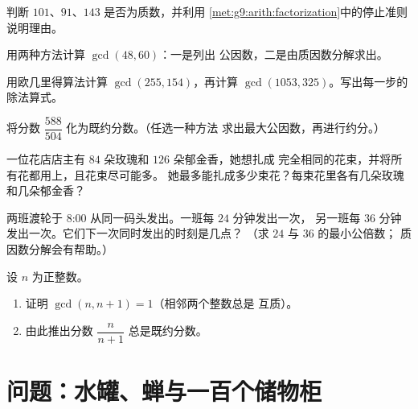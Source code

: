 \begin{exercise}[$\star$]\label{exo:g9:arith:4}
判断 $101$、$91$、$143$ 是否为质数，并利用
\cref{met:g9:arith:factorization}中的停止准则说明理由。
\end{exercise}

\begin{exercise}[$\star$]\label{exo:g9:arith:5}
用两种方法计算 $\gcd(48, 60)$：一是列出
公因数，二是由质因数分解求出。
\end{exercise}

\begin{exercise}[$\star\star$]\label{exo:g9:arith:6}
用欧几里得算法计算 $\gcd(255, 154)$，再计算
$\gcd(1053, 325)$。写出每一步的除法算式。
\end{exercise}

\begin{exercise}[$\star\star$]\label{exo:g9:arith:7}
将分数 $\dfrac{588}{504}$ 化为既约分数。（任选一种方法
求出最大公因数，再进行约分。）
\end{exercise}

\begin{exercise}[$\star\star$]\label{exo:g9:arith:8}
一位花店店主有 $84$ 朵玫瑰和 $126$ 朵郁金香，她想扎成
完全相同的花束，并将所有花都用上，且花束尽可能多。
她最多能扎成多少束花？每束花里各有几朵玫瑰和几朵郁金香？
\end{exercise}

\begin{exercise}[$\star\star$]\label{exo:g9:arith:9}
两班渡轮于 8:00 从同一码头发出。一班每 $24$ 分钟发出一次，
另一班每 $36$ 分钟发出一次。它们下一次同时发出的时刻是几点？
（求 $24$ 与 $36$ 的最小公倍数；
质因数分解会有帮助。）
\end{exercise}

\begin{exercise}[$\star\star\star$]\label{exo:g9:arith:10}
设 $n$ 为正整数。
\begin{enumerate}
  \item 证明 $\gcd(n, n+1) = 1$（相邻两个整数总是
        互质）。
  \item 由此推出分数 $\dfrac{n}{n+1}$ 总是既约分数。
\end{enumerate}
\end{exercise}

\section{问题：水罐、蝉与一百个储物柜}

